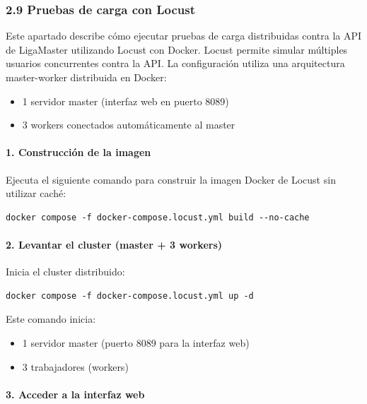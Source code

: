 \subsubsection*{2.9 Pruebas de carga con Locust}

Este apartado describe cómo ejecutar pruebas de carga distribuidas contra la API de LigaMaster utilizando Locust con Docker. Locust permite simular múltiples usuarios concurrentes contra la API. La configuración utiliza una arquitectura master-worker distribuida en Docker:

\begin{itemize}
    \item 1 servidor master (interfaz web en puerto 8089)
    \item 3 workers conectados automáticamente al master
\end{itemize}

\paragraph*{1. Construcción de la imagen}

Ejecuta el siguiente comando para construir la imagen Docker de Locust sin utilizar caché:

\begin{verbatim}
docker compose -f docker-compose.locust.yml build --no-cache
\end{verbatim}

\paragraph*{2. Levantar el cluster (master + 3 workers)}

Inicia el cluster distribuido:

\begin{verbatim}
docker compose -f docker-compose.locust.yml up -d
\end{verbatim}

Este comando inicia:

\begin{itemize}
    \item 1 servidor master (puerto 8089 para la interfaz web)
    \item 3 trabajadores (workers) 
\end{itemize}

\paragraph*{3. Acceder a la interfaz web}

